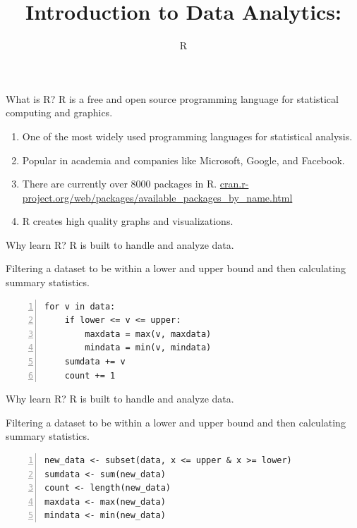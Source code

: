 \documentclass[xcolor=svgnames, 10pt]{beamer}
\title
  [R]
  {Introduction to Data Analytics:}
\subtitle{\Large R}
\begin{document}
\maketitle

\begin{frame}{What is R?}
R is a free and open source programming language for statistical computing and graphics.
\begin{enumerate}
\item One of the most widely used programming languages for statistical analysis.
\item Popular in academia and companies like Microsoft, Google, and Facebook. 
\item There are currently over 8000 packages in R. 
\url{cran.r-project.org/web/packages/available_packages_by_name.html}
\item R creates high quality graphs and visualizations.
\end{enumerate}
\end{frame}


\begin{frame}[fragile]{Why learn R?}
R is built to handle and analyze data. 
\begin{example}
Filtering a dataset to be within a lower and upper bound and then calculating summary statistics.\\[2em]

\begin{Verbatim}[xleftmargin=2em, xrightmargin=1.5em, frame=single, numbers=left, label=Python, framesep=0.5em]
for v in data:
    if lower <= v <= upper:
        maxdata = max(v, maxdata)
        mindata = min(v, mindata)
    sumdata += v
    count += 1
\end{Verbatim}
\end{example}
\end{frame}
\begin{frame}[fragile]{Why learn R?}
R is built to handle and analyze data. 
\begin{example}
Filtering a dataset to be within a lower and upper bound and then calculating summary statistics.\\[2em]

\begin{Verbatim}[xleftmargin=2em, xrightmargin=1.5em, frame=single, numbers=left, label=R, framesep=0.5em]
new_data <- subset(data, x <= upper & x >= lower)
sumdata <- sum(new_data)
count <- length(new_data)
maxdata <- max(new_data)
mindata <- min(new_data)
\end{Verbatim}
\end{example}
\end{frame}
\end{document}
